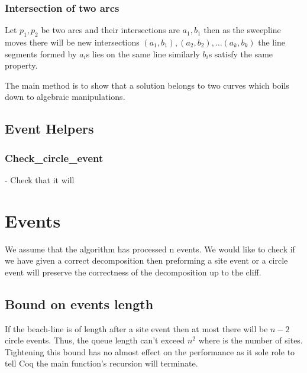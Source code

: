 \documentclass{article}
\begin{document}
\subsubsection{Intersection of two arcs}
Let $p_1, p_2$ be two arcs and their intersections are $a_1, b_1$ then as the sweepline moves there will be new intersections $\left(a_1, b_1\right),\left(a_2, b_2\right),\dots \left(a_k, b_k\right)$ the line segments formed by $a_i$s lies on the same line similarly  $b_i$s satisfy the same property.

The main method is to show that a solution belongs to two curves which boils down to algebraic manipulations.

\subsection{Event Helpers}
\subsubsection{Check\_circle\_event}
- Check that it will 

\section{Events}
We assume that the algorithm has processed n events. We would like to check if we have given a correct decomposition then preforming a site event or a circle event will preserve the correctness of the decomposition up to the cliff.

\subsection{Bound on events length} If the beach-line is of length after a site event then at most there will be $n-2$ circle events. Thus, the queue length can't exceed $n^2$ where is the number of sites. Tightening this bound has no almost effect on the performance as it sole role to tell Coq the main function's recursion will terminate.
\end{document}
